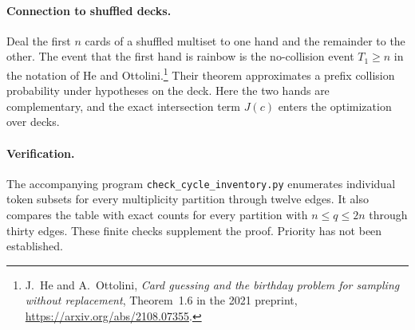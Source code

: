 \documentclass[11pt]{article}
\begin{document}
\paragraph{Connection to shuffled decks.}
Deal the first $n$ cards of a shuffled multiset to one hand and the remainder
to the other. The event that the first hand is rainbow is the no-collision
event $T_1\ge n$ in the notation of He and Ottolini.\footnote{J.~He and
A.~Ottolini, \emph{Card guessing and the birthday problem for sampling
without replacement}, Theorem~1.6 in the 2021 preprint,
\url{https://arxiv.org/abs/2108.07355}.}
Their theorem approximates a prefix collision probability under hypotheses
on the deck. Here the two hands are complementary, and the exact intersection
term $J(c)$ enters the optimization over decks.

\paragraph{Verification.}
The accompanying program \texttt{check\_cycle\_inventory.py} enumerates
individual token subsets for every multiplicity partition through twelve
edges. It also compares the table with exact counts for every partition
with $n\le q\le2n$ through thirty edges. These finite checks supplement
the proof. Priority has not been established.
\end{document}

